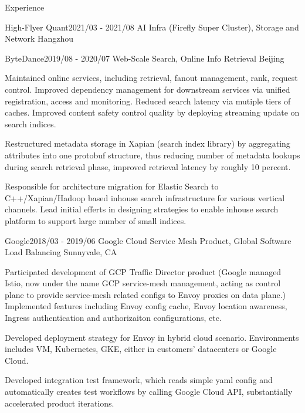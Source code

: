 \documentclass[
	a4paper,  %
	11pt,  %
]{resume}  %
\begin{document}
\begin{rSection}{Experience}
\begin{rSubsection}{High-Flyer Quant}{2021/03 - 2021/08}{ AI Infra (Firefly Super Cluster), Storage and Network }{Hangzhou}
	\end{rSubsection}


	\begin{rSubsection}{ByteDance}{2019/08 - 2020/07}{ Web-Scale Search, Online Info Retrieval }{Beijing}
		\item Maintained online services, including retrieval, fanout management, rank, request control.
			  Improved dependency management for downstream services via unified registration, access and monitoring.
			  Reduced search latency via mutiple tiers of caches.
			  Improved content safety control quality by deploying streaming update on search indices.
		\item Restructured metadata storage in Xapian (search index library) by aggregating attributes into one protobuf structure,
			  thus reducing number of metadata lookups during search retrieval phase, improved retrieval latency by roughly 10 percent. 
		\item Responsible for architecture migration for Elastic Search to C++/Xapian/Hadoop based inhouse search infrastructure
			  for various vertical channels.
			  Lead initial efferts in designing strategies to enable inhouse search platform to support large number of small indices.
	\end{rSubsection}


\begin{rSubsection}{Google}{2018/03 - 2019/06}{ Google Cloud Service Mesh Product, Global Software Load Balancing }{Sunnyvale, CA}
	\item Participated development of GCP Traffic Director product (Google managed Istio, now under the name GCP service-mesh management,
		  acting as control plane to provide service-mesh related configs to Envoy proxies on data plane.)
		  Implemented features including Envoy config cache, Envoy location awareness, Ingress authentication and authorizaiton configurations, etc.
	\item Developed deployment strategy for Envoy in hybrid cloud scenario. Environments includes VM, Kubernetes, GKE,
		  either in customers' datacenters or Google Cloud.
	\item Developed integration test framework, which reads simple yaml config and
		  automatically creates test workflows by calling Google Cloud API, substantially accelerated product iterations.
\end{rSubsection}



\end{rSection}
\end{document}
